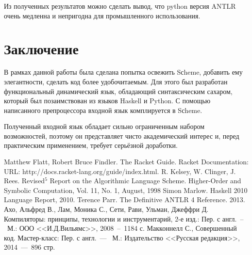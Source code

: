 \documentclass[12pt,a4paper,oneside]{extarticle}
\begin{document}
        Из полученных результатов можно сделать вывод, что python версия ANTLR очень медленна и непригодна для промышленного использования.
    
\clearpage

\section{Заключение}
    В рамках данной работы была сделана попытка освежить Sсheme, добавить ему элегантности, сделать код более удобочитаемым.
    Для этого был разработан функциональный динамический язык, обладающий синтаксическим сахаром, который был позаимствован из языков Haskell и Python.
    С помощью написанного препроцессора входной язык комплируется в Sсheme.

    Полученный входной язык обладает сильно ограниченным набором возможностей, поэтому он представляет чисто академический интерес и, перед практическим применением, требует серьёзной доработки.
\clearpage

\begin{thebibliography}{0}
     Matthew Flatt, Robert Bruce Findler. The Racket Guide. Racket Documentation: URL: http://docs.racket-lang.org/guide/index.html.
     R. Kelsey, W. Clinger, J. Rees. Revised$^5$ Report on the Algorithmic Language Scheme. Higher-Order and Symbolic Computation, Vol. 11, No. 1, August, 1998
     Simon Marlow. Haskell 2010 Language Report, 2010.
     Terence Parr. The Definitive ANTLR 4 Reference. 2013.
     Ахо, Альфред В., Лам, Моника С., Сети, Рави, Ульман, Джеффри Д. Компиляторы: принципы, технологии и инструментарий, 2-е изд.: Пер. с англ.~--~М.: ООО <<И.Д.Вильямс>>, 2008~--~1184 с.
     Макконнелл С., Совершенный код. Мастер-класс: Пер. с англ.~---~ М.: Издательство <<Русская редакция>>, 2014~---~896 стр.        
\end{thebibliography}
\end{document}
